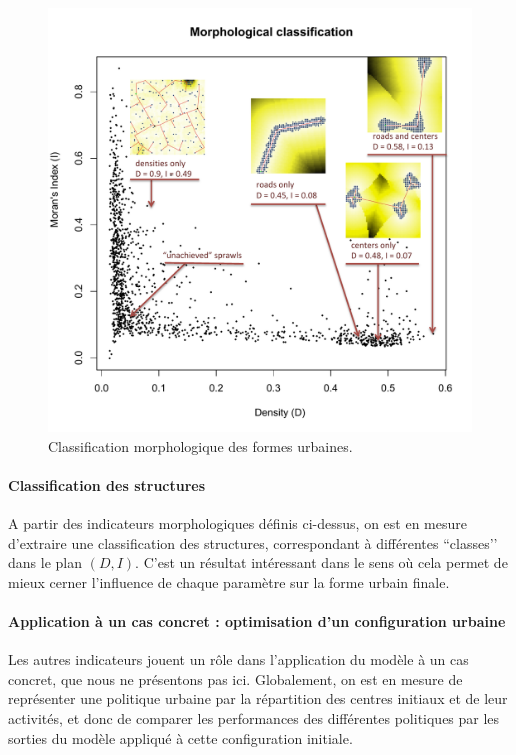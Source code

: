 \documentclass[french,12pt]{article}
\begin{document}
\begin{figure}
\centering
\includegraphics[trim=0mm 5mm 0mm 23mm, clip, width=\columnwidth]{figures/morpho}
\caption{\small Classification morphologique des formes urbaines.}
\label{fig_morpho}
\end{figure}

\paragraph{Classification des structures}

A partir des indicateurs morphologiques définis ci-dessus, on est en mesure d’extraire une classification des structures, correspondant à différentes ``classes’’ dans le plan $(D,I)$. C’est un résultat intéressant dans le sens où cela permet de mieux cerner l’influence de chaque paramètre sur la forme urbain finale.

\paragraph{Application à un cas concret : optimisation d’un configuration urbaine}

Les autres indicateurs jouent un rôle dans l’application du modèle à un cas concret, que nous ne présentons pas ici. Globalement, on est en mesure de représenter une politique urbaine par la répartition des centres initiaux et de leur activités, et donc de comparer les performances des différentes politiques par les sorties du modèle appliqué à cette configuration initiale.
\end{document}
